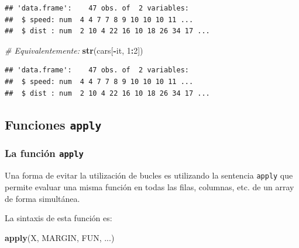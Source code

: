 \documentclass[
]{book}
\newenvironment{Shaded}{\begin{snugshade}}{\end{snugshade}}
\newcommand{\CommentTok}[1]{\textcolor[rgb]{0.56,0.35,0.01}{\textit{#1}}}
\newcommand{\DecValTok}[1]{\textcolor[rgb]{0.00,0.00,0.81}{#1}}
\newcommand{\KeywordTok}[1]{\textcolor[rgb]{0.13,0.29,0.53}{\textbf{#1}}}
\newcommand{\NormalTok}[1]{#1}
\newcommand{\OperatorTok}[1]{\textcolor[rgb]{0.81,0.36,0.00}{\textbf{#1}}}
\begin{document}
\begin{verbatim}
## 'data.frame':    47 obs. of  2 variables:
##  $ speed: num  4 4 7 7 8 9 10 10 10 11 ...
##  $ dist : num  2 10 4 22 16 10 18 26 34 17 ...
\end{verbatim}

\begin{Shaded}
\begin{Highlighting}[]
\CommentTok{# Equivalentemente:}
\KeywordTok{str}\NormalTok{(cars[}\OperatorTok{-}\NormalTok{it, }\DecValTok{1}\OperatorTok{:}\DecValTok{2}\NormalTok{])}
\end{Highlighting}
\end{Shaded}

\begin{verbatim}
## 'data.frame':    47 obs. of  2 variables:
##  $ speed: num  4 4 7 7 8 9 10 10 10 11 ...
##  $ dist : num  2 10 4 22 16 10 18 26 34 17 ...
\end{verbatim}

\begin{Shaded}
\end{Shaded}

\hypertarget{funciones-apply}{%
\subsection{\texorpdfstring{Funciones \texttt{apply}}{Funciones apply}}\label{funciones-apply}}

\hypertarget{la-funciuxf3n-apply}{%
\subsubsection{\texorpdfstring{La función \texttt{apply}}{La función apply}}\label{la-funciuxf3n-apply}}

Una forma de evitar la
utilización de bucles es utilizando la sentencia \texttt{apply} que permite
evaluar una misma función en todas las filas, columnas, etc. de un array
de forma simultánea.

La sintaxis de esta función es:

\begin{Shaded}
\begin{Highlighting}[]
\KeywordTok{apply}\NormalTok{(X, MARGIN, FUN, ...)}
\end{Highlighting}
\end{Shaded}
\end{document}
